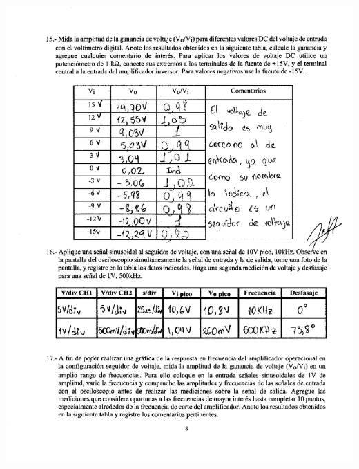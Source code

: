 \documentclass[12pt]{article}
\begin{document}
	\includegraphics[width=16cm,height=21cm]{Img/lab_9_page-0005}\\
	
\end{document}
